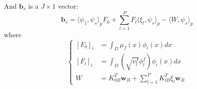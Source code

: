 And $\mathbf{b}_s$ is a $J\times 1$ vector:
\begin{equation}
    \mathbf{b}_s = \langle \psi_1, \psi_s\rangle_pF_0 + \sum_{l=1}^{P}F_l\langle \xi_l, \psi_s\rangle_p - \langle W, \psi_s\rangle_p
\end{equation}
where
\begin{equation}\left\{
    \begin{aligned}
        \left[F_0\right]_{i} &= \int_D \mu_f(x)\phi_i(x)dx\\
        \left[F_l\right]_{i} &= \int_D (\sqrt{v_l^f}\phi_l^f)\phi_i(x)dx\\
        W &= K^T_{0B}\mathbf{w}_B+\sum_{l=1}^{P}K^T_{lB}\xi_l\mathbf{w}_B
    \end{aligned}\right.
\end{equation}


























